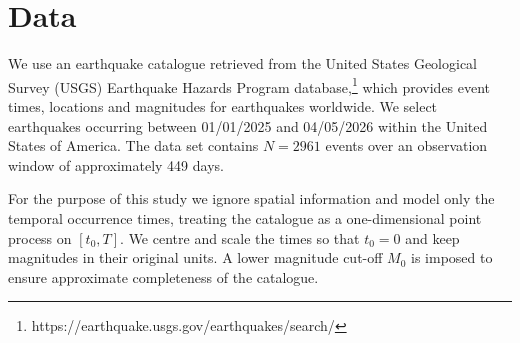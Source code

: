 \section{Data}

We use an earthquake catalogue retrieved from the United States Geological
Survey (USGS) Earthquake Hazards Program database,\footnote{https://earthquake.usgs.gov/earthquakes/search/}
which provides event times, locations and magnitudes
for earthquakes worldwide. We select earthquakes occurring between
01/01/2025 and 04/05/2026 within the United States of America. The data set
contains $N = 2961$ events over an observation window of approximately
449 days.

For the purpose of this study we ignore spatial information and model only
the temporal occurrence times, treating the catalogue as a one-dimensional
point process on $[t_0, T]$. We centre and scale the times so that $t_0 = 0$
and keep magnitudes in their original units. A lower magnitude cut-off $M_0$
is imposed to ensure approximate completeness of the catalogue.
